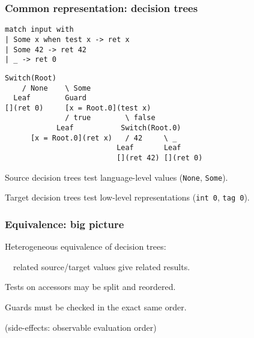 \documentclass[dvipsnames]{beamer}
\begin{document}
\begin{frame}[fragile]
  \frametitle{Common representation: decision trees}
\begin{lstlisting}
match input with
| Some x when test x -> ret x
| Some 42 -> ret 42
| _ -> ret 0
\end{lstlisting}

\vfill\pause

\begin{lstlisting}[columns=fixed]
    Switch(Root)
    / None    \ Some
  Leaf        Guard
[](ret 0)     [x = Root.0](test x)
              / true        \ false
            Leaf           Switch(Root.0)
      [x = Root.0](ret x)   / 42     \ _
                          Leaf       Leaf
                          [](ret 42) [](ret 0)
\end{lstlisting}

\vfill\pause

Source decision trees test language-level values (\texttt{None}, \texttt{Some}).

Target decision trees test low-level representations (\texttt{int 0}, \texttt{tag 0}).
\end{frame}

\begin{frame}
  \frametitle{Equivalence: big picture}

  Heterogeneous equivalence of decision trees:

  $\quad$related source/target values give related results.

  \vfill

  Tests on accessors may be split and reordered.

  \vfill

  Guards must be checked in the exact same order.

  (side-effects: observable evaluation order)
\end{frame}
\end{document}
